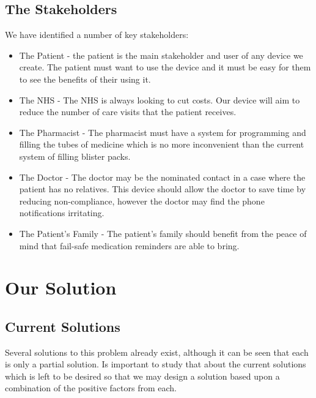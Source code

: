 \documentclass{article}
\begin{document}
    \subsection{The Stakeholders}
    We have identified a number of key stakeholders:
    \begin{itemize}
      \item The Patient - the patient is the main stakeholder and user of any device we create. The patient must want to use the device and it must be easy for them to see the benefits of their using it.
      \item The NHS - The NHS is always looking to cut costs. Our device will aim to reduce the number of care visits that the patient receives.
      \item The Pharmacist - The pharmacist must have a system for programming and filling the tubes of medicine which is no more inconvenient than the current system of filling blister packs.
      \item The Doctor - The doctor may be the nominated contact in a case where the patient has no relatives. This device should allow the doctor to save time by reducing non-compliance, however the doctor may find the phone notifications irritating.
      \item The Patient's Family - The patient's family should benefit from the peace of mind that fail-safe medication reminders are able to bring.
    \end{itemize}


\section{Our Solution}
	\subsection{Current Solutions}
	Several solutions to this problem already exist, although it can be seen that each is only a partial solution. Is important to study that about the current solutions which is left to be desired so that we may design a solution based upon a combination of the positive factors from each.
\end{document}
